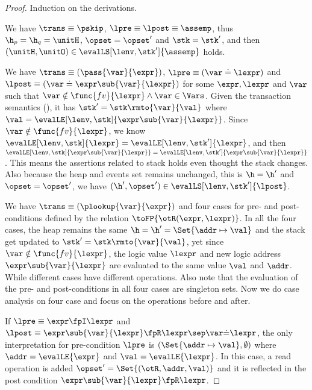 \begin{proof}
Induction on the derivations.


We have  \(\trans \equiv \pskip\), \( \lpre \equiv \lpost \equiv \assemp \), thus \( \h_{p} = \h_{q} = \unitH \), \( \opset = \opset' \) and \( \stk = \stk' \), and then \( (\unitH,\unitO ) \in \evalLS[\lenv, \stk']{\assemp} \) holds.


We have \(\trans \equiv ( \pass{\var}{\expr} ) \), \( \lpre \equiv ( \var \doteq \lexpr ) \) and \( \lpost \equiv ( \var \doteq \expr\sub{\var}{\lexpr} ) \) for some \( \expr, \lexpr \) and \( \var \) such that \( \var \notin \func{fv}{\lexpr} \land \var \in \Vars\).
Given the transaction semantics (), it has \( \stk' = \stk\rmto{\var}{\val} \) where \( \val = \evalLE[\lenv, \stk]{\expr\sub{\var}{\lexpr}} \).
Since \( \var \notin \func{fv}{\lexpr} \), we know \( \evalLE[\lenv, \stk]{\lexpr} = \evalLE[\lenv, \stk']{\lexpr} \), and then \( \evalLE[\lenv, \stk]{\expr\sub{\var}{\lexpr}} = \evalLE[\lenv, \stk']{\expr\sub{\var}{\lexpr}} \).
This means the assertions related to stack holds even thought the stack changes.
Also because the heap and events set remains unchanged, this is \( \h = \h' \) and \( \opset = \opset' \), we have \( (\h', \opset' ) \in \evalLS[\lenv, \stk']{\lpost} \).



We have  \(\trans \equiv ( \plookup{\var}{\expr} ) \) and four cases for pre- and post-conditions defined by the relation \( \toFP{\otR(\expr, \lexpr)}\).
In all the four cases, the heap remains the same \( \h = \h' = \Set{\addr \mapsto \val}\) and the stack get updated to \( \stk' = \stk\rmto{\var}{\val} \), yet since \( \var \notin \func{fv}{\lexpr}\), the logic value \( \lexpr \) and new logic address \( \expr\sub{\var}{\lexpr}\) are evaluated to the same value \( \val \) and \( \addr \).
While different cases have different operations.
Also note that the evaluation of the pre- and post-conditions in all four cases are singleton sets.
Now we do case analysis on four case and focus on the operations before and after.

If \( \lpre \equiv \expr \fpI \lexpr \) and \( \lpost \equiv \expr\sub{\var}{\lexpr} \fpR \lexpr \sep \var \dot= \lexpr \), the only interpretation for pre-condition \( \lpre \) is \( (\Set{\addr \mapsto \val}, \emptyset) \) where \( \addr = \evalLE{\expr} \) and \( \val = \evalLE{\lexpr}\).
In this case, a read operation is added \( \opset' = \Set{(\otR, \addr, \val)} \) and it is reflected in the post condition  \( \expr\sub{\var}{\lexpr} \fpR \lexpr  \).


\end{proof}

